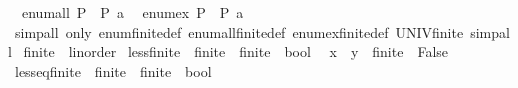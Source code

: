 \begin{isabellebody}
\isanewline
\ \ {\isachardoublequoteopen}enum{\isacharunderscore}{\kern0pt}all\ P\ {\isacharequal}{\kern0pt}\ P\ a\isanewline
\isanewline
{}\isamarkupfalse%
\isanewline
\ \ {\isachardoublequoteopen}enum{\isacharunderscore}{\kern0pt}ex\ P\ {\isacharequal}{\kern0pt}\ P\ a\isanewline
\isanewline
{}\isamarkupfalse%
%
\isadelimproof
\ %
\endisadelimproof
%
\isatagproof
{}\isamarkupfalse%
\isanewline
{}\isamarkupfalse%
\ {\isacharparenleft}{\kern0pt}simp{\isacharunderscore}{\kern0pt}all\ only{\isacharcolon}{\kern0pt}\ enum{\isacharunderscore}{\kern0pt}finite{\isacharunderscore}{\kern0pt}{}{\isacharunderscore}{\kern0pt}def\ enum{\isacharunderscore}{\kern0pt}all{\isacharunderscore}{\kern0pt}finite{\isacharunderscore}{\kern0pt}{}{\isacharunderscore}{\kern0pt}def\ enum{\isacharunderscore}{\kern0pt}ex{\isacharunderscore}{\kern0pt}finite{\isacharunderscore}{\kern0pt}{}{\isacharunderscore}{\kern0pt}def\ UNIV{\isacharunderscore}{\kern0pt}finite{\isacharunderscore}{\kern0pt}{}{\isacharcomma}{\kern0pt}\ simp{\isacharunderscore}{\kern0pt}all{\isacharparenright}{\kern0pt}%
\endisatagproof
{\isafoldproof}%
%
\isadelimproof
%
\endisadelimproof
\isanewline
\isanewline
{}\isamarkupfalse%
\isanewline
\isanewline
{}\isamarkupfalse%
\ finite{\isacharunderscore}{\kern0pt}{}\ {\isacharcolon}{\kern0pt}{\isacharcolon}{\kern0pt}\ linorder\isanewline
{}\isanewline
\isanewline
{}\isamarkupfalse%
\ less{\isacharunderscore}{\kern0pt}finite{\isacharunderscore}{\kern0pt}{}\ {\isacharcolon}{\kern0pt}{\isacharcolon}{\kern0pt}\ {\isachardoublequoteopen}finite{\isacharunderscore}{\kern0pt}{}\ {\isasymRightarrow}\ finite{\isacharunderscore}{\kern0pt}{}\ {\isasymRightarrow}\ bool{\isachardoublequoteclose}\isanewline
{}\isanewline
\ \ {\isachardoublequoteopen}x\ {\isacharless}{\kern0pt}\ {\isacharparenleft}{\kern0pt}y\ {\isacharcolon}{\kern0pt}{\isacharcolon}{\kern0pt}\ finite{\isacharunderscore}{\kern0pt}{}{\isacharparenright}{\kern0pt}\ {\isasymlongleftrightarrow}\ False{\isachardoublequoteclose}\isanewline
\isanewline
{}\isamarkupfalse%
\ less{\isacharunderscore}{\kern0pt}eq{\isacharunderscore}{\kern0pt}finite{\isacharunderscore}{\kern0pt}{}\ {\isacharcolon}{\kern0pt}{\isacharcolon}{\kern0pt}\ {\isachardoublequoteopen}finite{\isacharunderscore}{\kern0pt}{}\ {\isasymRightarrow}\ finite{\isacharunderscore}{\kern0pt}{}\ {\isasymRightarrow}\ bool{\isachardoublequoteclose}\isanewline

\end{isabellebody}
